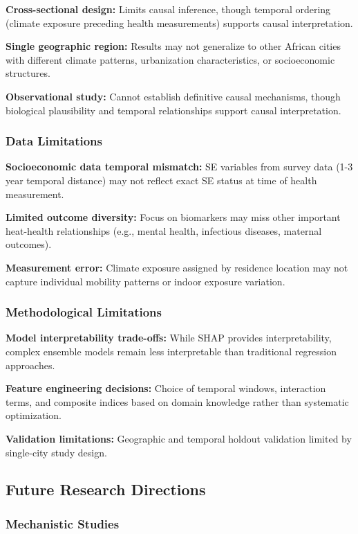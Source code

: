 \documentclass[11pt,a4paper]{article}
\begin{document}
\textbf{Cross-sectional design:} Limits causal inference, though temporal ordering (climate exposure preceding health measurements) supports causal interpretation.

\textbf{Single geographic region:} Results may not generalize to other African cities with different climate patterns, urbanization characteristics, or socioeconomic structures.

\textbf{Observational study:} Cannot establish definitive causal mechanisms, though biological plausibility and temporal relationships support causal interpretation.

\subsubsection{Data Limitations}

\textbf{Socioeconomic data temporal mismatch:} SE variables from survey data (1-3 year temporal distance) may not reflect exact SE status at time of health measurement.

\textbf{Limited outcome diversity:} Focus on biomarkers may miss other important heat-health relationships (e.g., mental health, infectious diseases, maternal outcomes).

\textbf{Measurement error:} Climate exposure assigned by residence location may not capture individual mobility patterns or indoor exposure variation.

\subsubsection{Methodological Limitations}

\textbf{Model interpretability trade-offs:} While SHAP provides interpretability, complex ensemble models remain less interpretable than traditional regression approaches.

\textbf{Feature engineering decisions:} Choice of temporal windows, interaction terms, and composite indices based on domain knowledge rather than systematic optimization.

\textbf{Validation limitations:} Geographic and temporal holdout validation limited by single-city study design.

\subsection{Future Research Directions}

\subsubsection{Mechanistic Studies}
\end{document}
